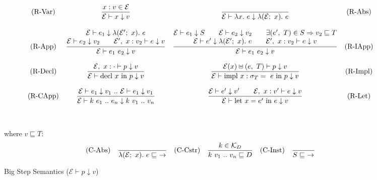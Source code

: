 \documentclass[runningheads]{llncs}
\begin{document}
\begin{figure}$$
  \begin{array}{c c c c} 
    \text{(R-Var)}
    &
    \displaystyle
    \frac{x: v  \in \mathcal{E}}
         {\mathcal{E} \vdash x \downarrow v}
    &
    \displaystyle
    \frac{}
    {\mathcal{E} \vdash \lambda x. \ e \downarrow \lambda (\mathcal{E}; \ x). \ e}
    &
    \text{(R-Abs)}
    \\\\
    \text{(R-App)}
    &
    \displaystyle
    \frac{ \begin{matrix}
      \mathcal{E} \vdash e_1 \downarrow \lambda (\mathcal{E^\prime}; \ x). \ e \\
      \mathcal{E} \vdash e_2 \downarrow v_2 \quad \quad \mathcal{E}^\prime, \ x : v_2 \vdash e \downarrow v
    \end{matrix}}
         {\mathcal{E} \vdash e_1 \ e_2 \downarrow v}
    &
    \displaystyle
    \frac{ \begin{matrix}
      \mathcal{E} \vdash e_1 \downarrow S \quad \quad \mathcal{E} \vdash e_2 \downarrow v_2 \quad\quad \exists(e^\prime, \ T) \in S  \Rightarrow v_2 \sqsubseteq T \\
      \mathcal{E} \vdash e^\prime \downarrow \lambda (\mathcal{E^\prime}; \ x). \ e  \quad \quad \mathcal{E}^\prime, \ x : v_2 \vdash e \downarrow v
    \end{matrix}}
         {\mathcal{E} \vdash e_1 \ e_2 \downarrow v}
    &
    \text{(R-IApp)}
    \\\\
    \text{(R-Decl)}
    &
    \displaystyle
    \frac{\mathcal{E}, \ x : \cdot \vdash p \downarrow v}
         {\mathcal{E} \vdash \text{decl} \ x \ \text{in} \ p \downarrow v}
    &
    \displaystyle
    \frac{\mathcal{E}(x) \uplus (e, \ T) \vdash p \downarrow v}
         {\mathcal{E} \vdash \text{impl} \ x : \sigma_T = \ e \ \text{in} \ p \downarrow v}
    &
    \text{(R-Impl)}
    \\\\
    \text{(R-CApp)}
    &
    \displaystyle
    \frac{\mathcal{E} \vdash e_1 \downarrow v_1 \ .. \ \mathcal{E} \vdash e_1 \downarrow v_1}
         {\mathcal{E} \vdash k \ e_1 \ .. \ e_n \downarrow k \ v_1 \ .. \ v_n}
    &
    \displaystyle
    \frac{\mathcal{E} \vdash e^\prime \downarrow v^\prime \quad\quad \mathcal{E},\ x : v^\prime \vdash e \downarrow v}
         {\mathcal{E} \vdash \text{let} \ x = e^\prime \ \text{in} \ e \downarrow v}
    &
    \text{(R-Let)}
  \end{array}$$
  \\\\
  where $v \sqsubseteq T:$
  $$\begin{array}{c c c c c c} 
    \text{(C-Abs)}
    &
    \displaystyle
    \frac{}
         {\lambda (\mathcal{E}; \ x). \ e \sqsubseteq \ \rightarrow}
    &
    \text{(C-Cstr)}
    &
    \displaystyle
    \frac{k \in \mathcal{K}_D}
    {k \ v_1 \ .. \ v_n \sqsubseteq D}
    &
    \text{(C-Inst)}
    &
    \displaystyle
    \frac{}
    {S \sqsubseteq \ \rightarrow}
  \end{array}$$
  \caption{Big Step Semantics ($\mathcal{E} \vdash p \downarrow v$)}
\end{figure}
\end{document}
